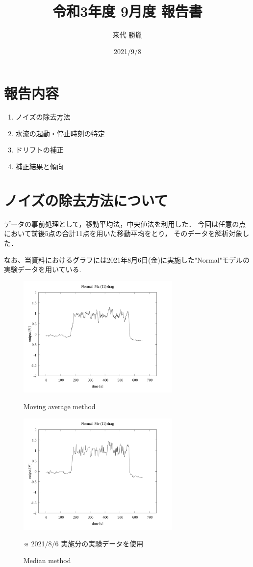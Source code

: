 \documentclass[twocolumn,a4j]{jsarticle}
\author{来代 勝胤}
\title{令和3年度 9月度 報告書}
\date{2021/9/8}
\begin{document}
\columnseprule=0.1mm

\maketitle
\section*{報告内容}
\begin{enumerate}[1.]
    \item ノイズの除去方法
    \item 水流の起動・停止時刻の特定
    \item ドリフトの補正
    \item 補正結果と傾向
\end{enumerate}
\section{ノイズの除去方法について}
データの事前処理として，移動平均法，中央値法を利用した．
今回は任意の点において前後5点の合計11点を用いた移動平均をとり，
そのデータを解析対象した．
\par
なお、当資料におけるグラフには2021年8月6日(金)に実施した"Normal"モデルの実験データを用いている.
\begin{figure}[htbp]
    \footnotesize
    \begin{center}
        \includegraphics[width=80mm]{images/Normal_ma(11)_drag_01.png}
        \caption{Moving average method}
        \includegraphics[width=80mm]{images/Normal_me(11)_drag_01.png}
        \caption{Median method}
        ※ 2021/8/6 実施分の実験データを使用
    \end{center}
\end{figure}
\end{document}
